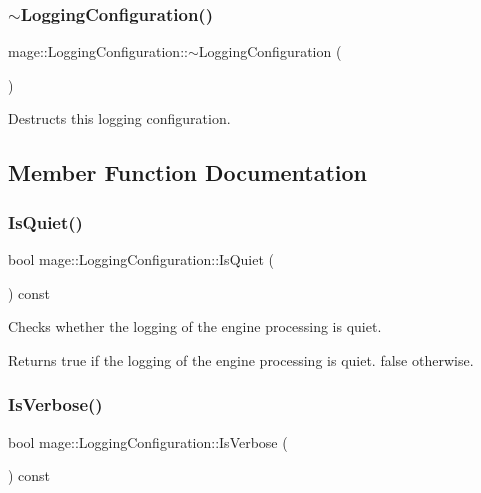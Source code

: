 \subsubsection{\texorpdfstring{$\sim$\+Logging\+Configuration()}{~LoggingConfiguration()}}
{\footnotesize\ttfamily mage\+::\+Logging\+Configuration\+::$\sim$\+Logging\+Configuration (\begin{DoxyParamCaption}{ }\end{DoxyParamCaption})\hspace{0.3cm}{\ttfamily [default]}}

Destructs this logging configuration. 

\subsection{Member Function Documentation}
\hypertarget{structmage_1_1_logging_configuration_ac081313b7a9440bcd73b6a9b69ff3452}{}\label{structmage_1_1_logging_configuration_ac081313b7a9440bcd73b6a9b69ff3452} 
\subsubsection{\texorpdfstring{Is\+Quiet()}{IsQuiet()}}
{\footnotesize\ttfamily bool mage\+::\+Logging\+Configuration\+::\+Is\+Quiet (\begin{DoxyParamCaption}{ }\end{DoxyParamCaption}) const}

Checks whether the logging of the engine processing is quiet.

\begin{DoxyReturn}{Returns}
{\ttfamily true} if the logging of the engine processing is quiet. {\ttfamily false} otherwise. 
\end{DoxyReturn}
\hypertarget{structmage_1_1_logging_configuration_a13d91de33f888eee31f4d4e6b1237675}{}\label{structmage_1_1_logging_configuration_a13d91de33f888eee31f4d4e6b1237675} 
\subsubsection{\texorpdfstring{Is\+Verbose()}{IsVerbose()}}
{\footnotesize\ttfamily bool mage\+::\+Logging\+Configuration\+::\+Is\+Verbose (\begin{DoxyParamCaption}{ }\end{DoxyParamCaption}) const}

